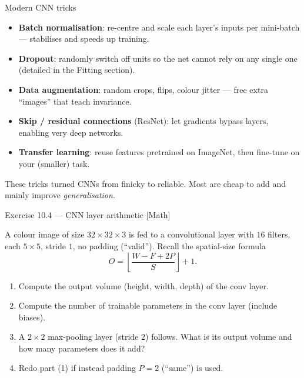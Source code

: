 \documentclass[aspectratio=169,11pt]{beamer}
\begin{document}
\begin{frame}{Modern CNN tricks}
  \begin{itemize}
    \item \textbf{Batch normalisation}: re-centre and scale each layer's inputs per
          mini-batch --- stabilises and speeds up training.
    \item \textbf{Dropout}: randomly switch off units so the net cannot rely on any
          single one (detailed in the Fitting section).
    \item \textbf{Data augmentation}: random crops, flips, colour jitter --- free
          extra ``images'' that teach invariance.
    \item \textbf{Skip / residual connections} (ResNet): let gradients bypass layers,
          enabling very deep networks.
    \item \textbf{Transfer learning}: reuse features pretrained on ImageNet, then
          fine-tune on your (smaller) task.
  \end{itemize}
  \begin{takeaway}
    These tricks turned CNNs from finicky to reliable. Most are cheap to add and
    mainly improve \emph{generalisation}.
  \end{takeaway}
\end{frame}


\begin{frame}{Exercise 10.4 --- CNN layer arithmetic [Math]}
\begin{exercise}
  A colour image of size $32 \times 32 \times 3$ is fed to a
  convolutional layer with $16$ filters, each $5 \times 5$, stride
  $1$, no padding (``valid''). Recall the spatial-size formula
  \[
    O = \left\lfloor\frac{W - F + 2P}{S}\right\rfloor + 1 .
  \]
  \begin{enumerate}
    \item Compute the output volume (height, width, depth) of the
          conv layer.
    \item Compute the number of trainable parameters in the conv layer
          (include biases).
    \item A $2 \times 2$ max-pooling layer (stride $2$) follows. What
          is its output volume and how many parameters does it add?
    \item Redo part (1) if instead padding $P = 2$ (``same'') is used.
  \end{enumerate}
\end{exercise}
\end{frame}
\end{document}
